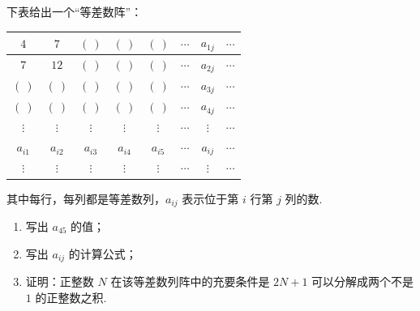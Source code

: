 \begin{problem}
下表给出一个“等差数阵”：

\begin{center}
\small
\begin{tabular}{|c|c|c|c|c|c|c|c|}
\hline
\(4\) & \(7\) & \(\left(\ \right)\) & \(\left(\ \right)\) & \(\left(\ \right)\) & \(\cdots\) & \(a_{1j}\) & \(\cdots\) \\
\hline
\(7\) & \(12\) & \(\left(\ \right)\) & \(\left(\ \right)\) & \(\left(\ \right)\) & \(\cdots\) & \(a_{2j}\) & \(\cdots\) \\
\hline
\(\left(\ \right)\) & \(\left(\ \right)\) & \(\left(\ \right)\) & \(\left(\ \right)\) & \(\left(\ \right)\) & \(\cdots\) & \(a_{3j}\) & \(\cdots\) \\
\hline
\(\left(\ \right)\) & \(\left(\ \right)\) & \(\left(\ \right)\) & \(\left(\ \right)\) & \(\left(\ \right)\) & \(\cdots\) & \(a_{4j}\) & \(\cdots\) \\
\hline
\(\vdots\) & \(\vdots\) & \(\vdots\) & \(\vdots\) & \(\vdots\) & \(\cdots\) & \(\vdots\) & \(\cdots\) \\
\hline
\(a_{i1}\) & \(a_{i2}\) & \(a_{i3}\) & \(a_{i4}\) & \(a_{i5}\) & \(\cdots\) & \(a_{ij}\) & \(\cdots\) \\
\hline
\(\vdots\) & \(\vdots\) & \(\vdots\) & \(\vdots\) & \(\vdots\) & \(\cdots\) & \(\vdots\) & \(\cdots\) \\
\hline
\end{tabular}
\end{center}

其中每行，每列都是等差数列，\(a_{ij}\) 表示位于第 \(i\) 行第 \(j\) 列的数.

\begin{enumerate}
\item 写出 \(a_{45}\) 的值；
\item 写出 \(a_{ij}\) 的计算公式；
\item 证明：正整数 \(N\) 在该等差数列阵中的充要条件是 \(2N+1\) 可以分解成两个不是 \(1\) 的正整数之积.
\end{enumerate}
\end{problem}

